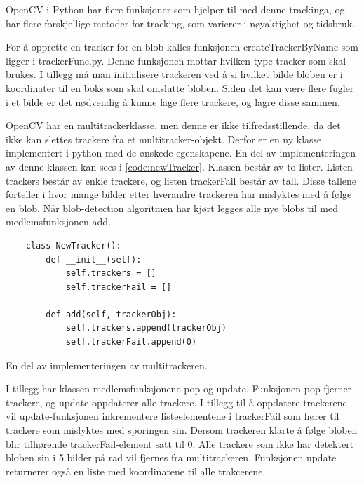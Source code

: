 OpenCV i Python har flere funksjoner som hjelper til med denne trackinga, og har flere forskjellige metoder for tracking, som varierer i nøyaktighet og tidsbruk.

For å opprette en tracker for en blob kalles funksjonen createTrackerByName som ligger i trackerFunc.py. Denne funksjonen mottar hvilken type tracker som skal brukes. I tillegg må man initialisere trackeren ved å si hvilket bilde bloben er i koordinater til en boks som skal omslutte bloben. Siden det kan være flere fugler i et bilde er det nødvendig å kunne lage flere trackere, og lagre disse sammen.

OpenCV har en multitrackerklasse, men denne er ikke tilfredsstillende, da det ikke kan slettes trackere fra et multitracker-objekt. Derfor er en ny klasse implementert i python med de ønskede egenskapene. En del av implementeringen av denne klassen kan sees i \autoref{code:newTracker}. Klassen består av to lister. Listen trackers består av enkle trackere, og listen trackerFail består av tall. Disse tallene forteller i hvor mange bilder etter hverandre trackeren har mislyktes med å følge en blob. Når blob-detection algoritmen har kjørt legges alle nye blobs til med medlemsfunksjonen add.
\begin{code}
\begin{verbatim}
    class NewTracker():                     
        def __init__(self):
            self.trackers = []             
            self.trackerFail = []
    
        def add(self, trackerObj):          
            self.trackers.append(trackerObj)
            self.trackerFail.append(0)
\end{verbatim}
\caption{En del av implementeringen av multitrackeren.}
\label{code:newTracker}
\end{code}
I tillegg har klassen medlemsfunksjonene pop og update. Funksjonen pop fjerner trackere, og update oppdaterer alle trackere. I tillegg til å oppdatere trackerene vil update-funksjonen inkrementere listeelementene i trackerFail som hører til trackere som mislyktes med sporingen sin. Dersom trackeren klarte å følge bloben blir tilhørende trackerFail-element satt til 0. Alle trackere som ikke har detektert bloben sin i 5 bilder på rad vil fjernes fra multitrackeren. Funksjonen update returnerer også en liste med koordinatene til alle trakcerene.


